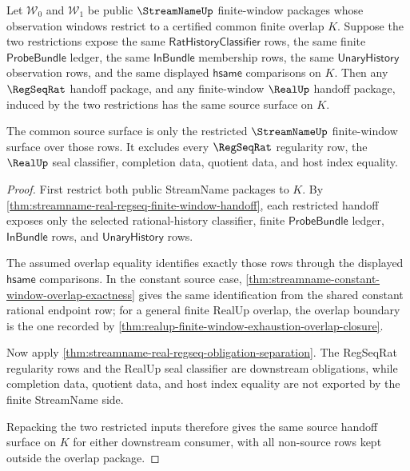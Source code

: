 \begin{theorem}
\label{thm:streamname-real-regseq-finite-overlap-source-stability}
Let $\mathcal{W}_0$ and $\mathcal{W}_1$ be public $\StreamNameUp$
finite-window packages whose observation windows restrict to a certified common
finite overlap $K$. Suppose the two restrictions expose the same
$\mathsf{RatHistoryClassifier}$ rows, the same finite
$\mathsf{ProbeBundle}$ ledger, the same $\mathsf{InBundle}$ membership rows,
the same $\mathsf{UnaryHistory}$ observation rows, and the same displayed
$\mathsf{hsame}$ comparisons on $K$. Then any $\RegSeqRat$ handoff package, and
any finite-window $\RealUp$ handoff package, induced by the two restrictions
has the same source surface on $K$.

The common source surface is only the restricted $\StreamNameUp$ finite-window
surface over those rows. It excludes every $\RegSeqRat$ regularity row, the
$\RealUp$ seal classifier, completion data, quotient data, and host index
equality.
\end{theorem}
\begin{proof}
First restrict both public StreamName packages to $K$. By
\autoref{thm:streamname-real-regseq-finite-window-handoff}, each restricted
handoff exposes only the selected rational-history classifier, finite
$\mathsf{ProbeBundle}$ ledger, $\mathsf{InBundle}$ rows, and
$\mathsf{UnaryHistory}$ rows.

The assumed overlap equality identifies exactly those rows through the
displayed $\mathsf{hsame}$ comparisons. In the constant source case,
\autoref{thm:streamname-constant-window-overlap-exactness} gives the same
identification from the shared constant rational endpoint row; for a general
finite RealUp overlap, the overlap boundary is the one recorded by
\autoref{thm:realup-finite-window-exhaustion-overlap-closure}.

Now apply \autoref{thm:streamname-real-regseq-obligation-separation}. The
RegSeqRat regularity rows and the RealUp seal classifier are downstream
obligations, while completion data, quotient data, and host index equality are
not exported by the finite StreamName side.

Repacking the two restricted inputs therefore gives the same source handoff
surface on $K$ for either downstream consumer, with all non-source rows kept
outside the overlap package.
\end{proof}

